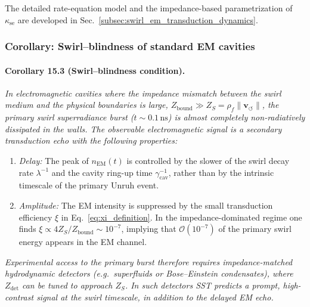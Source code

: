 \documentclass[10pt,reprint,aps,onecolumn,nofootinbib]{revtex4-2}
\newcommand{\vswirl}{\mathbf{v}_{\!\boldsymbol{\circlearrowleft}}}
\newcommand{\rhoF}{\rho_{\!f}}
\begin{document}
The detailed rate-equation model and the impedance-based parametrization of $\kappa_{\text{se}}$ are developed in Sec.~\ref{subsec:swirl_em_transduction_dynamics}.


\subsubsection{Corollary: Swirl–blindness of standard EM cavities}
    \label{subsec:swirl_blindness_corollary}

    \paragraph*{Corollary 15.3 (Swirl–blindness condition).}
        \emph{
            In electromagnetic cavities where the impedance mismatch between the swirl
            medium and the physical boundaries is large,
            \(Z_{\mathrm{bound}} \gg Z_S = \rhoF \lVert\vswirl\rVert\), the primary
            swirl superradiance burst (\(t \sim 0.1\,\mathrm{ns}\)) is almost completely
            non-radiatively dissipated in the walls. The observable electromagnetic signal
            is a secondary transduction echo with the following properties:
        }
        \begin{enumerate}
            \item \emph{Delay:} The peak of \(n_{\mathrm{EM}}(t)\) is controlled by
            the slower of the swirl decay rate \(\lambda^{-1}\) and the cavity
            ring-up time \(\gamma_{\mathrm{cav}}^{-1}\), rather than by the
            intrinsic timescale of the primary Unruh event.
            \item \emph{Amplitude:} The EM intensity is suppressed by the small
            transduction efficiency \(\xi\) in Eq.~\eqref{eq:xi_definition}.
            In the impedance-dominated regime one finds
            \(\xi \propto 4 Z_S/Z_{\mathrm{bound}} \sim 10^{-7}\), implying that
            \(\mathcal{O}(10^{-7})\) of the primary swirl energy appears in the
            EM channel.
        \end{enumerate}
        \emph{
            Experimental access to the primary burst therefore requires
            impedance-matched hydrodynamic detectors (e.g.\ superfluids or
            Bose–Einstein condensates), where \(Z_{\mathrm{det}}\) can be tuned to
            approach \(Z_S\). In such detectors SST predicts a prompt, high-contrast
            signal at the swirl timescale, in addition to the delayed EM echo.
        }
\end{document}
